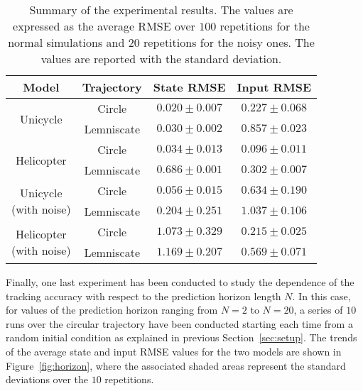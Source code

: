 \documentclass[../main.tex]{subfiles}
\begin{document}
\begin{table}[htb]
  \renewcommand{\arraystretch}{1.3} %
  \centering
  \begin{tabular}{|c|c|c|c|}

    \hline
    \rowcolor{boxcolor}
	\textbf{Model} & \textbf{Trajectory} & \textbf{State RMSE} & \textbf{Input
	RMSE} \\

	\hline
	\multirow{2}{*}{Unicycle} & Circle & $0.020 \pm 0.007$ & $0.227 \pm 0.068$ \\
	\cline{2-4}
	& Lemniscate & $0.030 \pm 0.002$ & $0.857 \pm 0.023$ \\
	\hline

	\multirow{2}{*}{Helicopter} & Circle & $0.034 \pm 0.013$ & $0.096 \pm 0.011$ \\
	\cline{2-4}
	& Lemniscate & $0.686 \pm 0.001$ & $0.302 \pm 0.007$ \\
	\hline

	\multirow{2}{*}{\parbox{2cm}{Unicycle\\(with noise)}} & Circle & $0.056 \pm
	0.015$ & $0.634 \pm 0.190$ \\
	\cline{2-4}
	& Lemniscate & $0.204 \pm 0.251$ & $1.037 \pm 0.106$ \\
	\hline

	\multirow{2}{*}{\parbox{2cm}{Helicopter\\(with noise)}} & Circle & $1.073
	\pm 0.329$ & $0.215 \pm 0.025$ \\
	\cline{2-4}
			   & Lemniscate & $1.169 \pm 0.207$ & $0.569 \pm 0.071$ \\
	\hline

  \end{tabular}
  \caption{Summary of the experimental results. The values are expressed as the
	  average RMSE over $100$ repetitions for the normal simulations and $20$
	  repetitions for the noisy ones. The values are reported with the
	  standard deviation.}\label{tab:results}
  \renewcommand{\arraystretch}{1} %
\end{table}

Finally, one last experiment has been conducted to study the dependence of the
tracking accuracy with respect to the prediction horizon length $N$. In this
case, for values of the prediction horizon ranging from $N = 2$ to $N = 20$, a
series of $10$ runs over the circular trajectory have been conducted starting
each time from a random initial condition as explained in previous
Section~\ref{sec:setup}.
The trends of the average state and input RMSE values for the two models are
shown in Figure~\ref{fig:horizon}, where the associated shaded areas represent
the standard deviations over the $10$ repetitions.
\end{document}
